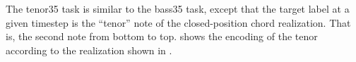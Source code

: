 
The \gls{tenor35} task is similar to the \gls{bass35} task,
except that the target label at a given timestep is the
``tenor'' note of the \gls{closed-position} chord
realization. That is, the second note from bottom to top.
 shows the encoding of the tenor
according to the realization shown in .


